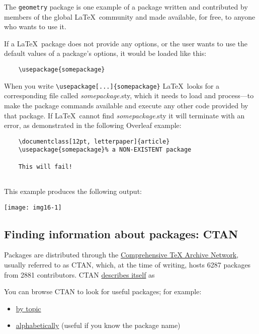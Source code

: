 The \verb|geometry| package is one example of a package written and contributed by members of the global \LaTeX\ community and made available, for free, to anyone who wants to use it.

If a \LaTeX\ package does not provide any options, or the user wants to use the default values of a package’s options, it would be loaded like this:

\begin{tcolorbox}
\begin{verbatim}
    \usepackage{somepackage}
\end{verbatim}
\end{tcolorbox}

When you write \verb|\usepackage[...]{somepackage}| \LaTeX\ looks for a corresponding file called \emph{somepackage}.sty, which it needs to load and process—to make the package commands available and execute any other code provided by that package. If \LaTeX\ cannot find \emph{somepackage}.sty it will terminate with an error, as demonstrated in the following Overleaf example:

\begin{tcolorbox}
\begin{verbatim}
    \documentclass[12pt, letterpaper]{article}
    \usepackage{somepackage}% a NON-EXISTENT package
    
    This will fail!
    
\end{verbatim}
\end{tcolorbox}

This example produces the following output:

\texttt{[image: img16-1]}

\subsection{Finding information about packages: CTAN}

Packages are distributed through the \href{https://www.ctan.org/}{Comprehensive TeX Archive Network}, usually referred to as CTAN, which, at the time of writing, hosts 6287 packages from 2881 contributors. CTAN \href{https://www.ctan.org/ctan}{describes itself} as


You can browse CTAN to look for useful packages; for example:

\begin{itemize}
    \item \href{https://www.ctan.org/topics/cloud}{by topic}
    \item \href{https://www.ctan.org/pkg}{alphabetically} (useful if you know the package name)
\end{itemize}

